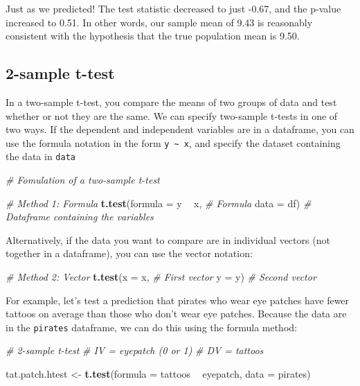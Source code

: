 \documentclass[]{book}
\newenvironment{Shaded}{\begin{snugshade}}{\end{snugshade}}
\newcommand{\KeywordTok}[1]{\textcolor[rgb]{0.13,0.29,0.53}{\textbf{#1}}}
\newcommand{\DataTypeTok}[1]{\textcolor[rgb]{0.13,0.29,0.53}{#1}}
\newcommand{\StringTok}[1]{\textcolor[rgb]{0.31,0.60,0.02}{#1}}
\newcommand{\CommentTok}[1]{\textcolor[rgb]{0.56,0.35,0.01}{\textit{#1}}}
\newcommand{\OperatorTok}[1]{\textcolor[rgb]{0.81,0.36,0.00}{\textbf{#1}}}
\newcommand{\NormalTok}[1]{#1}
\theoremstyle{definition}
\theoremstyle{definition}
\theoremstyle{remark}
\begin{document}
Just as we predicted! The test statistic decreased to just -0.67, and
the p-value increased to 0.51. In other words, our sample mean of 9.43
is reasonably consistent with the hypothesis that the true population
mean is 9.50.

\subsection{2-sample t-test}\label{sample-t-test-1}

In a two-sample t-test, you compare the means of two groups of data and
test whether or not they are the same. We can specify two-sample t-tests
in one of two ways. If the dependent and independent variables are in a
dataframe, you can use the formula notation in the form
\texttt{y\ \textasciitilde{}\ x}, and specify the dataset containing the
data in \texttt{data}

\begin{Shaded}
\begin{Highlighting}[]
\CommentTok{# Fomulation of a two-sample t-test}

\CommentTok{# Method 1: Formula}
\KeywordTok{t.test}\NormalTok{(}\DataTypeTok{formula =}\NormalTok{ y }\OperatorTok{~}\StringTok{ }\NormalTok{x,  }\CommentTok{# Formula}
       \DataTypeTok{data =}\NormalTok{ df) }\CommentTok{# Dataframe containing the variables}
\end{Highlighting}
\end{Shaded}

Alternatively, if the data you want to compare are in individual vectors
(not together in a dataframe), you can use the vector notation:

\begin{Shaded}
\begin{Highlighting}[]
\CommentTok{# Method 2: Vector}
\KeywordTok{t.test}\NormalTok{(}\DataTypeTok{x =}\NormalTok{ x,  }\CommentTok{# First vector}
       \DataTypeTok{y =}\NormalTok{ y)  }\CommentTok{# Second vector}
\end{Highlighting}
\end{Shaded}

For example, let's test a prediction that pirates who wear eye patches
have fewer tattoos on average than those who don't wear eye patches.
Because the data are in the \texttt{pirates} dataframe, we can do this
using the formula method:

\begin{Shaded}
\begin{Highlighting}[]
\CommentTok{# 2-sample t-test}
\CommentTok{#  IV = eyepatch (0 or 1)}
\CommentTok{#  DV = tattoos}

\NormalTok{tat.patch.htest <-}\StringTok{ }\KeywordTok{t.test}\NormalTok{(}\DataTypeTok{formula =}\NormalTok{ tattoos }\OperatorTok{~}\StringTok{ }\NormalTok{eyepatch,}
                          \DataTypeTok{data =}\NormalTok{ pirates)}
\end{Highlighting}
\end{Shaded}
\end{document}
